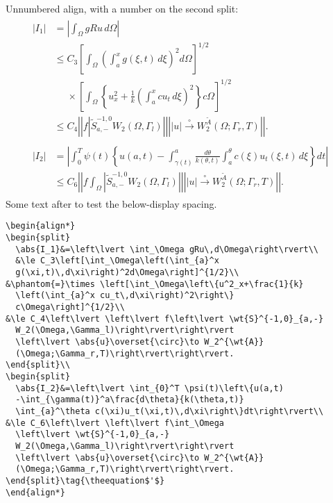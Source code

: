 \documentclass{article}
\DeclareRobustCommand*\ntt{\normalfont\ttfamily}
\newcommand{\env}[1]{{\ntt#1}}
\theoremstyle{definition}
\theoremstyle{remark}
\newcommand{\wt}{\widetilde}
\newcommand{\envert}[1]{\left\lvert#1\right\rvert}
\let\abs=\envert
\begin{document}

\newpage
Unnumbered \env{align}, with a number on the second \env{split}:
\begin{align*}
\begin{split}
  \abs{I_1}&=\left\lvert \int_\Omega gRu\,d\Omega\right\rvert\\
  &\le C_3\left[\int_\Omega\left(\int_{a}^x
  g(\xi,t)\,d\xi\right)^2d\Omega\right]^{1/2}\\
&\phantom{=}\times \left[\int_\Omega\left\{u^2_x+\frac{1}{k}
  \left(\int_{a}^x cu_t\,d\xi\right)^2\right\}
  c\Omega\right]^{1/2}\\
&\le C_4\left\lvert \left\lvert f\left\lvert \wt{S}^{-1,0}_{a,-}
  W_2(\Omega,\Gamma_l)\right\rvert\right\rvert
  \left\lvert \abs{u}\overset{\circ}\to W_2^{\wt{A}}
  (\Omega;\Gamma_r,T)\right\rvert\right\rvert.
\end{split}\\
\begin{split}\abs{I_2}&=\left\lvert \int_{0}^T \psi(t)\left\{u(a,t)
  -\int_{\gamma(t)}^a\frac{d\theta}{k(\theta,t)}
  \int_{a}^\theta c(\xi)u_t(\xi,t)\,d\xi\right\}dt\right\rvert\\
&\le C_6\left\lvert \left\lvert f\int_\Omega
  \left\lvert \wt{S}^{-1,0}_{a,-}
  W_2(\Omega,\Gamma_l)\right\rvert\right\rvert
  \left\lvert \abs{u}\overset{\circ}\to W_2^{\wt{A}}
  (\Omega;\Gamma_r,T)\right\rvert\right\rvert.
\end{split}\tag{\theequation$'$}
\end{align*}
Some text after to test the below-display spacing.

\begin{verbatim}
\begin{align*}
\begin{split}
  \abs{I_1}&=\left\lvert \int_\Omega gRu\,d\Omega\right\rvert\\
  &\le C_3\left[\int_\Omega\left(\int_{a}^x
  g(\xi,t)\,d\xi\right)^2d\Omega\right]^{1/2}\\
&\phantom{=}\times \left[\int_\Omega\left\{u^2_x+\frac{1}{k}
  \left(\int_{a}^x cu_t\,d\xi\right)^2\right\}
  c\Omega\right]^{1/2}\\
&\le C_4\left\lvert \left\lvert f\left\lvert \wt{S}^{-1,0}_{a,-}
  W_2(\Omega,\Gamma_l)\right\rvert\right\rvert
  \left\lvert \abs{u}\overset{\circ}\to W_2^{\wt{A}}
  (\Omega;\Gamma_r,T)\right\rvert\right\rvert.
\end{split}\\
\begin{split}
  \abs{I_2}&=\left\lvert \int_{0}^T \psi(t)\left\{u(a,t)
  -\int_{\gamma(t)}^a\frac{d\theta}{k(\theta,t)}
  \int_{a}^\theta c(\xi)u_t(\xi,t)\,d\xi\right\}dt\right\rvert\\
&\le C_6\left\lvert \left\lvert f\int_\Omega
  \left\lvert \wt{S}^{-1,0}_{a,-}
  W_2(\Omega,\Gamma_l)\right\rvert\right\rvert
  \left\lvert \abs{u}\overset{\circ}\to W_2^{\wt{A}}
  (\Omega;\Gamma_r,T)\right\rvert\right\rvert.
\end{split}\tag{\theequation$'$}
\end{align*}
\end{verbatim}
\end{document}
